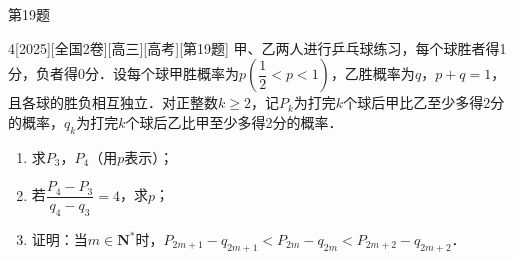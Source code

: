\begin{frame}[allowframebreaks]{第19题}
\begin{example}{4}[2025][全国2卷][高三][高考][第19题]
甲、乙两人进行乒乓球练习，每个球胜者得1分，负者得0分．设每个球甲胜概率为$p\left(\dfrac{1}{2}<p<1\right)$，乙胜概率为$q$，$p+q=1$，且各球的胜负相互独立．对正整数$k\ge 2$，记$P_k$为打完$k$个球后甲比乙至少多得2分的概率，$q_k$为打完$k$个球后乙比甲至少多得2分的概率．
\begin{enumerate}
    \item 求$P_3$，$P_4$（用$p$表示）；
    \item 若$\dfrac{P_4-P_3}{q_4-q_3}=4$，求$p$；
    \item 证明：当$m\in \mathbf{N}^*$时，$P_{2m+1}-q_{2m+1}<P_{2m}-q_{2m}<P_{2m+2}-q_{2m+2}$．
\end{enumerate}
\end{example}
\end{frame}
